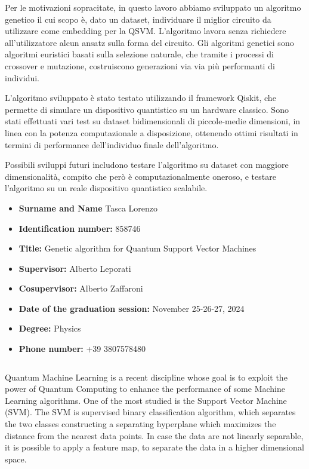 \documentclass{article}
\begin{document}
Per le motivazioni sopracitate, in questo lavoro abbiamo sviluppato un algoritmo genetico il cui scopo è, dato un dataset, individuare il miglior circuito da utilizzare come embedding per la QSVM. L'algoritmo lavora senza richiedere all'utilizzatore alcun ansatz sulla forma del circuito. Gli algoritmi genetici sono algoritmi euristici basati sulla selezione naturale, che tramite i processi di crossover e mutazione, costruiscono generazioni via via più performanti di individui. 

L'algoritmo sviluppato è stato testato utilizzando il framework Qiskit, che permette di simulare un dispositivo quantistico su un hardware classico. Sono stati effettuati vari test su dataset bidimensionali di piccole-medie dimensioni, in linea con la potenza computazionale a disposizione, ottenendo ottimi risultati in termini di performance dell'individuo finale dell'algoritmo.

Possibili sviluppi futuri includono testare l'algoritmo su dataset con maggiore dimensionalità, compito che però è computazionalmente oneroso, e testare l'algoritmo su un reale dispositivo quantistico scalabile.





\newpage
\begin{itemize}
    \item \textbf{Surname  and Name} Tasca Lorenzo
    \item \textbf{Identification number:} 858746
    \item \textbf{Title:} Genetic algorithm for Quantum Support Vector Machines    
    \item \textbf{Supervisor:} Alberto Leporati
    \item \textbf{Cosupervisor:} Alberto Zaffaroni
    \item \textbf{Date of the graduation session:} November 25-26-27, 2024
    \item \textbf{Degree:} Physics
    \item \textbf{Phone number:} +39 3807578480
    
\end{itemize}
$\,$

Quantum Machine Learning is a recent discipline whose goal is to exploit the power of Quantum Computing to enhance the performance of some Machine Learning algorithms. One of the most studied is the Support Vector Machine (SVM). The SVM is supervised binary classification algorithm, which separates the two classes constructing a separating hyperplane which maximizes the distance from the nearest data points. In case the data are not linearly separable, it is possible to apply a feature map, to separate the data in a higher dimensional space. 
\end{document}
